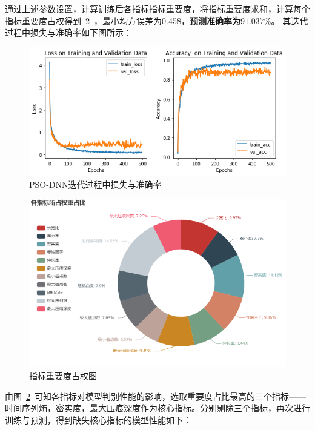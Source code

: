 \documentclass{whutmod}
\begin{document}
	通过上述参数设置，计算训练后各指标指标重要度，将指标重要度求和，计算每个指标重要度占权得到~\ref{quanzhong}~，最小均方误差为0.458，\textbf{预测准确率为$91.037\%$}。
	其迭代过程中损失与准确率如下图所示：
	\begin{figure}[H]
		\centering
		\includegraphics[width=\textwidth]{figures/x.png}
		\caption{PSO-DNN迭代过程中损失与准确率}\label{xxx}
	\end{figure}

	\begin{figure}[H]
	\centering
	\includegraphics[width=\textwidth]{figures/quanzhong2.png}
	\caption{指标重要度占权图}\label{quanzhong}
		
\end{figure}

	由图~\ref{quanzhong}~可知各指标对模型判别性能的影响，选取重要度占比最高的三个指标——时间序列熵，密实度，最大压痕深度作为核心指标。分别剔除三个指标，再次进行训练与预测，得到缺失核心指标的模型性能如下：
	
\end{document}
